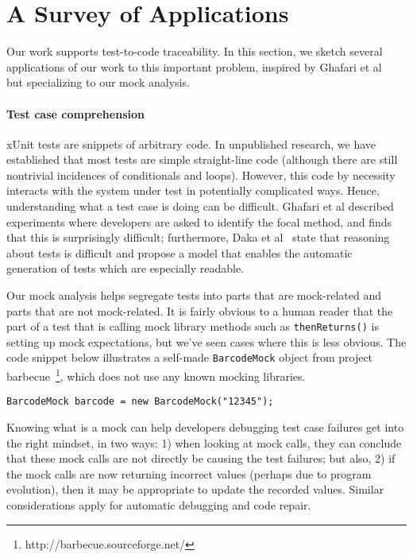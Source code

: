 \section{A Survey of Applications}
\label{sec:applications}

Our work supports test-to-code traceability. In this section, we
sketch several applications of our work to this important problem,
inspired by Ghafari et al~\cite{ghafari15:_autom} but specializing to
our mock analysis.

\paragraph{Test case comprehension} xUnit tests are snippets of arbitrary
code. In unpublished research, we have established that most tests are
simple straight-line code (although there are still nontrivial incidences of
conditionals and loops). However, this code by necessity interacts with
the system under test in potentially complicated ways. Hence,
understanding what a test case is doing can be difficult. Ghafari et
al described experiments where developers are asked to identify the
focal method, and finds that this is surprisingly difficult;
furthermore, Daka et al~\cite{daka15:_model_readab_improv_unit_tests}
state that reasoning about tests is difficult and propose a model that
enables the automatic generation of tests which are especially
readable.

Our mock analysis helps segregate tests into parts that are
mock-related and parts that are not mock-related.  It is fairly
obvious to a human reader that the part of a test that is calling mock
library methods such as \texttt{thenReturns()} is setting up mock
expectations, but we've seen cases where this is less
obvious. The code snippet below illustrates a self-made \texttt{BarcodeMock} object from project barbecue~\footnote{http://barbecue.sourceforge.net/}, which does not use any known mocking libraries.

\begin{lstlisting}[basicstyle=\ttfamily\small,numbers=none]
	BarcodeMock barcode = new BarcodeMock("12345");
\end{lstlisting}


Knowing what is a mock can help developers debugging test case
failures get into the right mindset, in two ways: 1) when looking at
mock calls, they can conclude that these mock calls are not
directly be causing the test failures; but also, 2) if the mock calls
are now returning incorrect values (perhaps due to program evolution),
then it may be appropriate to update the recorded values. Similar considerations
apply for automatic debugging and code repair.

